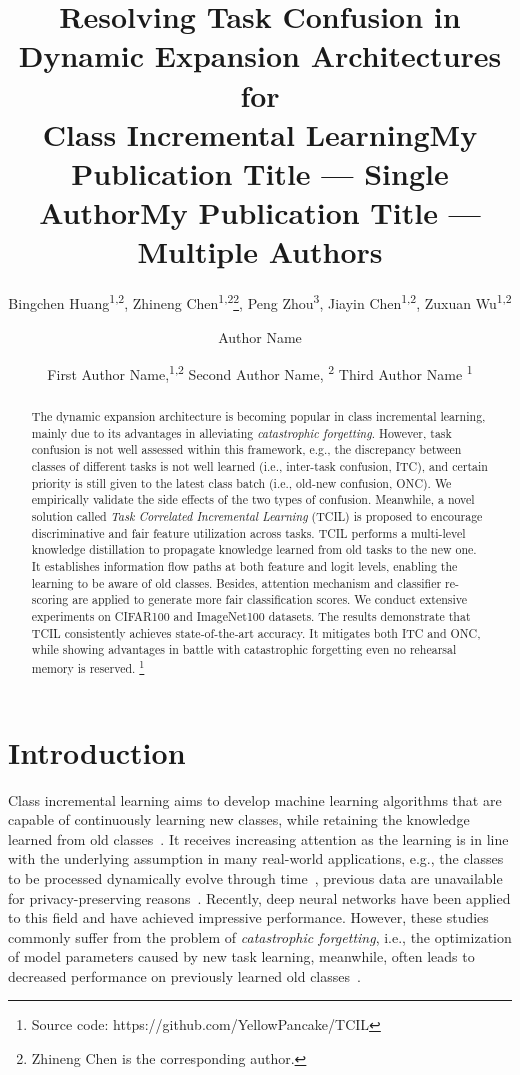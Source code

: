 \documentclass[letterpaper]{article} \usepackage{aaai23}  \usepackage{times}  \usepackage{helvet}  \usepackage{courier}  \usepackage[hyphens]{url}  \usepackage{graphicx} \urlstyle{rm} \def\UrlFont{\rm}  \usepackage{natbib}  \usepackage{caption} \frenchspacing  \setlength{\pdfpagewidth}{8.5in}  \setlength{\pdfpageheight}{11in}  \usepackage{algorithm}
\title{Resolving Task Confusion in Dynamic Expansion Architectures for \\ Class Incremental Learning}
\author{
Bingchen Huang\textsuperscript{\rm 1,\rm 2},
    Zhineng Chen\textsuperscript{\rm 1,\rm 2}\thanks{Zhineng Chen is the corresponding author.},
    Peng Zhou\textsuperscript{\rm 3},
    Jiayin Chen\textsuperscript{\rm 1,\rm 2},
    Zuxuan Wu\textsuperscript{\rm 1,\rm 2}
}
\title{My Publication Title --- Single Author}
\author {
    Author Name
}
\title{My Publication Title --- Multiple Authors}
\author {
First Author Name,\textsuperscript{\rm 1,\rm 2}
    Second Author Name, \textsuperscript{\rm 2}
    Third Author Name \textsuperscript{\rm 1}
}
\begin{document}
\maketitle

\begin{abstract}
The dynamic expansion architecture is becoming popular in class incremental learning, mainly due to its advantages in alleviating \emph{catastrophic forgetting}. However, task confusion is not well assessed within this framework, e.g., the discrepancy between classes of different tasks is not well learned (i.e., inter-task confusion, ITC), and certain priority is still given to the latest class batch (i.e., old-new confusion, ONC). We empirically validate the side effects of the two types of confusion. Meanwhile, a novel solution called \emph{Task Correlated Incremental Learning} (TCIL) is proposed to encourage discriminative and fair feature utilization across tasks. TCIL performs a multi-level knowledge distillation to propagate knowledge learned from old tasks to the new one. It establishes information flow paths at both feature and logit levels, enabling the learning to be aware of old classes. Besides, attention mechanism and classifier re-scoring are applied to generate more fair classification scores. We conduct extensive experiments on CIFAR100 and ImageNet100 datasets. The results demonstrate that TCIL consistently achieves state-of-the-art accuracy. It mitigates both ITC and ONC, while showing advantages in battle with catastrophic forgetting even no rehearsal memory is reserved. \footnote{Source code: https://github.com/YellowPancake/TCIL}
\end{abstract}



\section{Introduction}
Class incremental learning aims to develop machine learning algorithms that are capable of continuously learning new classes, while retaining the knowledge learned from old classes~\cite{m32,t54}. It receives increasing attention as the learning is in line with the underlying assumption in many real-world applications, e.g., the classes to be processed dynamically evolve through time~\cite{d25}, previous data are unavailable for privacy-preserving reasons~\cite{d19, e0}. Recently, deep neural networks have been applied to this field and have achieved impressive performance. However, these studies commonly suffer from the problem of \emph{catastrophic forgetting}, i.e., the optimization of model parameters caused by new task learning, meanwhile, often leads to decreased performance on previously learned old classes~\cite{m12,t38,lu2022bridging}.
\end{document}

